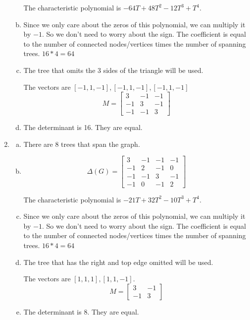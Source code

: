 \documentclass[12pt]{article}
\begin{document}
\begin{enumerate}[(G1)]
\begin{enumerate}[(a)]
				The characteristic polynomial is $ -64T + 48T^2 - 12T^3+T^4$.
			
			\item Since we only care about the zeros of this polynomial, we can multiply it by $ -1 $. So we don't need to worry about the sign. The coefficient is equal to the number of connected nodes/vertices times the number of spanning trees. $ 16 * 4 = 64 $
			
			\item The tree that omits the 3 sides of the triangle will be used.
			
				The vectors are $ [-1,1,-1], [-1,1,-1], [-1,1,-1] $
				\[ M = \begin{bmatrix}
					3 & -1 & -1\\
					-1 & 3 & -1\\
					-1 & -1 & 3
					\end{bmatrix} 
				\]
			
			\item The determinant is 16. They are equal.
		\end{enumerate}
	
	\item 
		\begin{enumerate}[(a)]
			\item There are 8 trees that span the graph.
			
			\item 
				\[\Delta(G) = 
					\begin{bmatrix}
						3 & -1 & -1 & -1\\
						-1 & 2 & -1 & 0\\
						-1 & -1 & 3 & -1\\
						-1 & 0 & -1 & 2
					\end{bmatrix}
				\]
				
				The characteristic polynomial is $ -21T + 32T^2 - 10T^3 + T^4$.
				
			\item Since we only care about the zeros of this polynomial, we can multiply it by $ -1 $. So we don't need to worry about the sign. The coefficient is equal to the number of connected nodes/vertices times the number of spanning trees. $ 16 * 4 = 64 $
			
			\item The tree that has the right and top edge omitted will be used. 
			
			The vectors are $ [1,1,1], [1,1,-1] $.
			\[M = \begin{bmatrix}
				3 & -1\\
				-1 & 3
			\end{bmatrix}\]
			
			\item The determinant is 8. They are equal.
		\end{enumerate}
\end{enumerate}
\end{document}
